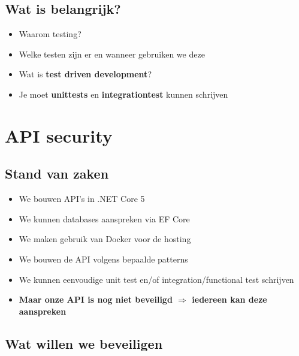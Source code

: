 \documentclass{article}
\begin{document}
\subsection{Wat is belangrijk?}

\begin{itemize}
    \item Waarom testing?
    \item Welke testen zijn er en wanneer gebruiken we deze
    \item Wat is \textbf{test driven development}?
    \item Je moet \textbf{unittests} en \textbf{integrationtest} kunnen schrijven
\end{itemize}

\section{API security}

\subsection{Stand van zaken}

\begin{itemize}
    \item We bouwen API’s in .NET Core 5
    \item We kunnen databases aanspreken via EF Core
    \item We maken gebruik van Docker voor de hosting
    \item We bouwen de API volgens bepaalde patterns
    \item We kunnen eenvoudige unit test en/of integration/functional test schrijven
    \item \textbf{Maar onze API is nog niet beveiligd $\Rightarrow$ iedereen kan deze aanspreken}
\end{itemize}

\subsection{Wat willen we beveiligen}
\end{document}
